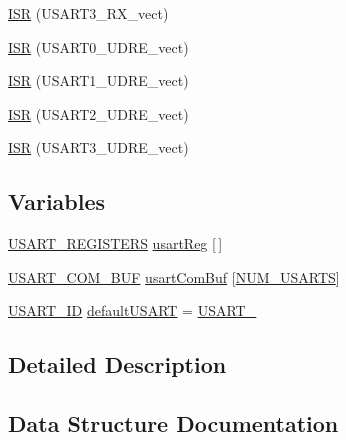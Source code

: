 \begin{DoxyCompactItemize}
\hyperlink{group__usart_async_module_ga88e32db0cad75219c51253f5c1052fc0}{I\+SR} (U\+S\+A\+R\+T3\+\_\+\+R\+X\+\_\+vect)
\item 
\hyperlink{group__usart_async_module_ga95e67e677722a53e3ad9f1ffce2e7408}{I\+SR} (U\+S\+A\+R\+T0\+\_\+\+U\+D\+R\+E\+\_\+vect)
\item 
\hyperlink{group__usart_async_module_gad6441110baf548d12ae53fcbed8075c5}{I\+SR} (U\+S\+A\+R\+T1\+\_\+\+U\+D\+R\+E\+\_\+vect)
\item 
\hyperlink{group__usart_async_module_ga6dd0f9b7dad929f4170efd85c67e04ba}{I\+SR} (U\+S\+A\+R\+T2\+\_\+\+U\+D\+R\+E\+\_\+vect)
\item 
\hyperlink{group__usart_async_module_ga965b31b0729ebabd50c26e4557d9609d}{I\+SR} (U\+S\+A\+R\+T3\+\_\+\+U\+D\+R\+E\+\_\+vect)
\end{DoxyCompactItemize}
\subsection*{Variables}
\begin{DoxyCompactItemize}
\item 
\hyperlink{group__usart_async_module_struct_u_s_a_r_t___r_e_g_i_s_t_e_r_s}{U\+S\+A\+R\+T\+\_\+\+R\+E\+G\+I\+S\+T\+E\+RS} \hyperlink{group__usart_async_module_gaf964270351d58d348a34bfec204765cb}{usart\+Reg} \mbox{[}$\,$\mbox{]}
\item 
\hyperlink{group__usart_async_module_struct_u_s_a_r_t___c_o_m___b_u_f}{U\+S\+A\+R\+T\+\_\+\+C\+O\+M\+\_\+\+B\+UF} \hyperlink{group__usart_async_module_ga01280f1bdc978bbad7a0ae0fca24f0f4}{usart\+Com\+Buf} \mbox{[}\hyperlink{group__usart_async_module_ga6829feca87a1bc576152b06505b91617}{N\+U\+M\+\_\+\+U\+S\+A\+R\+TS}\mbox{]}
\item 
\hyperlink{group__usart_async_module_gaae3c5ea77a411e5f40e4377f77067b86}{U\+S\+A\+R\+T\+\_\+\+ID} \hyperlink{group__usart_async_module_ga88cfc7c9ded2bea56fff795fe46b68c0}{default\+U\+S\+A\+RT} = \hyperlink{group__usart_async_module_ggaae3c5ea77a411e5f40e4377f77067b86a4ee9bfd4dd9ae53d762cc046ce72c892}{U\+S\+A\+R\+T\+\_}
\end{DoxyCompactItemize}


\subsection{Detailed Description}


\subsection{Data Structure Documentation}
\label{struct_u_s_a_r_t___c_o_m___b_u_f}
\hypertarget{group__usart_async_module_struct_u_s_a_r_t___c_o_m___b_u_f}{}
